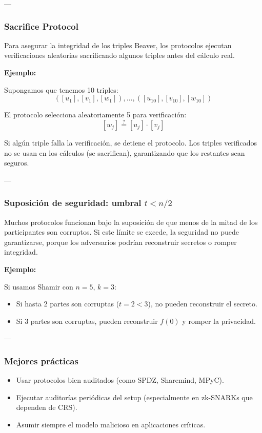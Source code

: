 \documentclass{article}
\begin{document}
---

\subsubsection{Sacrifice Protocol}

Para asegurar la integridad de los triples Beaver, los protocolos ejecutan verificaciones aleatorias sacrificando algunos triples antes del cálculo real.

\textbf{Ejemplo:}

Supongamos que tenemos 10 triples:
\[
([u_1], [v_1], [w_1]), \ldots, ([u_{10}], [v_{10}], [w_{10}])
\]

El protocolo selecciona aleatoriamente 5 para verificación:
\[
[w_j] \stackrel{?}{=} [u_j] \cdot [v_j]
\]

Si algún triple falla la verificación, se detiene el protocolo. Los triples verificados no se usan en los cálculos (se sacrifican), garantizando que los restantes sean seguros.

---

\subsubsection{Suposición de seguridad: umbral \( t < n/2 \)}

Muchos protocolos funcionan bajo la suposición de que menos de la mitad de los participantes son corruptos. Si este límite se excede, la seguridad no puede garantizarse, porque los adversarios podrían reconstruir secretos o romper integridad.

\textbf{Ejemplo:}

Si usamos Shamir con \( n = 5 \), \( k = 3 \):
\begin{itemize}
    \item Si hasta 2 partes son corruptas (\( t = 2 < 3 \)), no pueden reconstruir el secreto.
    \item Si 3 partes son corruptas, pueden reconstruir \( f(0) \) y romper la privacidad.
\end{itemize}

---

\subsubsection{Mejores prácticas}

\begin{itemize}
    \item Usar protocolos bien auditados (como SPDZ, Sharemind, MPyC).
    \item Ejecutar auditorías periódicas del setup (especialmente en zk-SNARKs que dependen de CRS).
    \item Asumir siempre el modelo malicioso en aplicaciones críticas.
\end{itemize}
\end{document}
